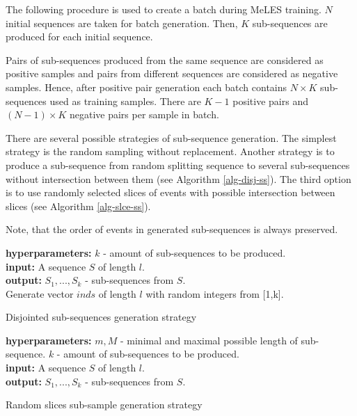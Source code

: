 \documentclass[sigconf, anonymous]{acmart}
\begin{document}
The following procedure is used to create a batch during MeLES training. $N$ initial sequences are taken for batch generation. Then, $K$ sub-sequences are produced for each initial sequence.

Pairs of sub-sequences produced from the same sequence are considered as positive samples and pairs from different sequences are considered as negative samples. Hence, after positive pair generation each batch contains $N \times K$ sub-sequences used as training samples. There are $K-1$ positive pairs and $(N - 1) \times K$ negative pairs per sample in batch.

There are several possible strategies of sub-sequence generation. The simplest strategy is the random sampling without replacement. Another strategy is to produce a sub-sequence from random splitting sequence to several sub-sequences without intersection between them (see Algorithm \ref{alg-disj-ss}). The third option is to use randomly selected slices of events with possible intersection between slices (see Algorithm \ref{alg-slce-ss}). 

Note, that the order of events in generated sub-sequences is always preserved.

\begin{algorithm}
\SetAlgoLined
\textbf{hyperparameters:} $k$ - amount of sub-sequences to be produced. \\
\textbf{input:} A sequence $S$ of length $l$. \\
\textbf{output:} $S_1,...,S_k$ - sub-sequences from $S$. \\

\BlankLine
Generate vector $inds$ of length $l$ with random integers from [1,k].\\
 \caption{Disjointed sub-sequences generation strategy}
\label{alg-disj-ss}

\end{algorithm}

\begin{algorithm}
\SetAlgoLined
\textbf{hyperparameters:} $m, M$ - minimal and maximal possible length of sub-sequence. $k$ - amount of sub-sequences to be produced. \\
\textbf{input:} A sequence $S$ of length $l$. \\
\textbf{output:} $S_1,...,S_k$ - sub-sequences from $S$. \\
\BlankLine
 \caption{Random slices sub-sample generation strategy}
\label{alg-slce-ss}
\end{algorithm}
\end{document}
